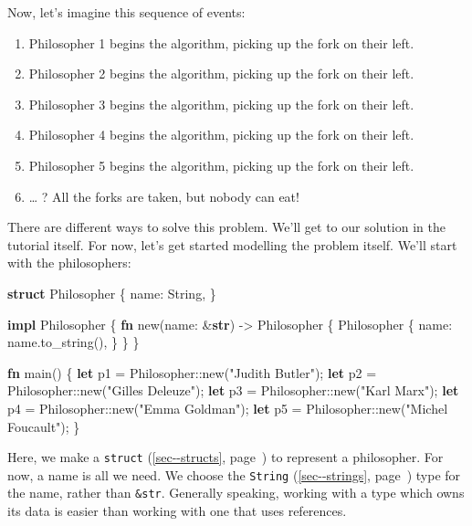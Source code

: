 \documentclass[a4paper,]{book}
\renewcommand*{\hyperref}[2][\ar]{%
  \def\ar{#2}%
  #2 (\autoref{#1}, page~\pageref{#1})}
\newenvironment{Shaded}{\begin{snugshade}}{\end{snugshade}}
\newcommand{\KeywordTok}[1]{\textcolor[rgb]{0.13,0.29,0.53}{\textbf{{#1}}}}
\newcommand{\StringTok}[1]{\textcolor[rgb]{0.31,0.60,0.02}{{#1}}}
\newcommand{\NormalTok}[1]{{#1}}
\begin{document}
Now, let's imagine this sequence of events:

\begin{enumerate}
\def\labelenumi{\arabic{enumi}.}
\itemsep1pt\parskip0pt
\item
  Philosopher 1 begins the algorithm, picking up the fork on their left.
\item
  Philosopher 2 begins the algorithm, picking up the fork on their left.
\item
  Philosopher 3 begins the algorithm, picking up the fork on their left.
\item
  Philosopher 4 begins the algorithm, picking up the fork on their left.
\item
  Philosopher 5 begins the algorithm, picking up the fork on their left.
\item
  \ldots{} ? All the forks are taken, but nobody can eat!
\end{enumerate}

There are different ways to solve this problem. We'll get to our
solution in the tutorial itself. For now, let's get started modelling
the problem itself. We'll start with the philosophers:

\begin{Shaded}
\begin{Highlighting}[]
\KeywordTok{struct} \NormalTok{Philosopher \{}
    \NormalTok{name: String,}
\NormalTok{\}}

\KeywordTok{impl} \NormalTok{Philosopher \{}
    \KeywordTok{fn} \NormalTok{new(name: &}\KeywordTok{str}\NormalTok{) -> Philosopher \{}
        \NormalTok{Philosopher \{}
            \NormalTok{name: name.to_string(),}
        \NormalTok{\}}
    \NormalTok{\}}
\NormalTok{\}}

\KeywordTok{fn} \NormalTok{main() \{}
    \KeywordTok{let} \NormalTok{p1 = Philosopher::new(}\StringTok{"Judith Butler"}\NormalTok{);}
    \KeywordTok{let} \NormalTok{p2 = Philosopher::new(}\StringTok{"Gilles Deleuze"}\NormalTok{);}
    \KeywordTok{let} \NormalTok{p3 = Philosopher::new(}\StringTok{"Karl Marx"}\NormalTok{);}
    \KeywordTok{let} \NormalTok{p4 = Philosopher::new(}\StringTok{"Emma Goldman"}\NormalTok{);}
    \KeywordTok{let} \NormalTok{p5 = Philosopher::new(}\StringTok{"Michel Foucault"}\NormalTok{);}
\NormalTok{\}}
\end{Highlighting}
\end{Shaded}

Here, we make a \hyperref[sec--structs]{\texttt{struct}} to represent a
philosopher. For now, a name is all we need. We choose the
\hyperref[sec--strings]{\texttt{String}} type for the name, rather than
\texttt{\&str}. Generally speaking, working with a type which owns its
data is easier than working with one that uses references.
\end{document}
